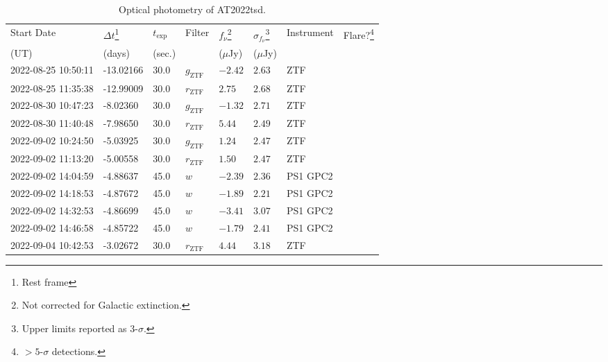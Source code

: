 \documentclass{nature_plusfigure}
\begin{document}
\begin{supplement}

\renewcommand{\thefigure}{Supplementary Information Figure~\arabic{figure}}
\renewcommand{\figurename}{}
\setcounter{figure}{0}
%


\renewcommand{\thetable}{Supplementary Information Table~\arabic{table}}
 \renewcommand{\tablename}{}
\setcounter{table}{0}

\begin{center} 
\begin{longtable}{llllllll} 
\caption{Optical photometry of AT2022tsd.} 
\label{tab:optical-photometry}\\ 
\hline\hline
Start Date & $\Delta t$\footnote{Rest frame} & $t_\mathrm{exp}$ & Filter & $f_\nu$\footnote{Not corrected for Galactic extinction.} & $\sigma_{f_\nu}$\footnote{Upper limits reported as 3-$\sigma$.} & Instrument & Flare?\footnote{$>5$-$\sigma$ detections.}\\ 
(UT) & (days) & (sec.) &  & ($\mu$Jy) & ($\mu$Jy) &  & \\ 
\hline
2022-08-25 10:50:11 & -13.02166 & 30.0 & ${g}_\mathrm{ZTF}$ & $-2.42$ & $2.63$ & ZTF &  \\ 
2022-08-25 11:35:38 & -12.99009 & 30.0 & ${r}_\mathrm{ZTF}$ & $2.75$ & $2.68$ & ZTF &  \\ 
2022-08-30 10:47:23 & -8.02360 & 30.0 & ${g}_\mathrm{ZTF}$ & $-1.32$ & $2.71$ & ZTF &  \\ 
2022-08-30 11:40:48 & -7.98650 & 30.0 & ${r}_\mathrm{ZTF}$ & $5.44$ & $2.49$ & ZTF &  \\ 
2022-09-02 10:24:50 & -5.03925 & 30.0 & ${g}_\mathrm{ZTF}$ & $1.24$ & $2.47$ & ZTF &  \\ 
2022-09-02 11:13:20 & -5.00558 & 30.0 & ${r}_\mathrm{ZTF}$ & $1.50$ & $2.47$ & ZTF &  \\ 
2022-09-02 14:04:59 & -4.88637 & 45.0 & $w$ & $-2.39$ & $2.36$ & PS1 GPC2 &  \\ 
2022-09-02 14:18:53 & -4.87672 & 45.0 & $w$ & $-1.89$ & $2.21$ & PS1 GPC2 &  \\ 
2022-09-02 14:32:53 & -4.86699 & 45.0 & $w$ & $-3.41$ & $3.07$ & PS1 GPC2 &  \\ 
2022-09-02 14:46:58 & -4.85722 & 45.0 & $w$ & $-1.79$ & $2.41$ & PS1 GPC2 &  \\ 
2022-09-04 10:42:53 & -3.02672 & 30.0 & ${r}_\mathrm{ZTF}$ & $4.44$ & $3.18$ & ZTF &  \\ 

\end{longtable}
\end{center}
\end{supplement}
\end{document}
